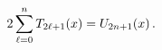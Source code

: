 \[2\sum_{\ell=0}^{n}\mathop{T_{2\ell+1}\/}\nolimits\!\left(x\right)=\mathop{U_{2%
n+1}\/}\nolimits\!\left(x\right).\]